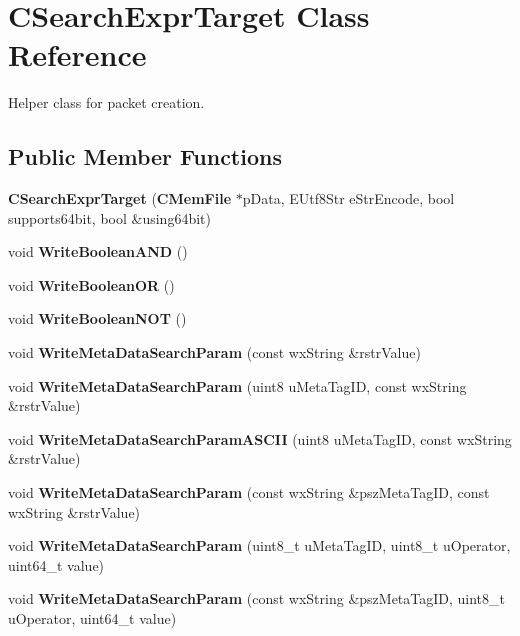 \section{CSearchExprTarget Class Reference}
\label{classCSearchExprTarget}


Helper class for packet creation.  
\subsection*{Public Member Functions}
\begin{DoxyCompactItemize}
\item 
{\bfseries CSearchExprTarget} ({\bf CMemFile} $\ast$pData, EUtf8Str eStrEncode, bool supports64bit, bool \&using64bit)\label{classCSearchExprTarget_a90de78d045d9b0cdf76a48194e67457e}

\item 
void {\bfseries WriteBooleanAND} ()\label{classCSearchExprTarget_ad206eebe66492bf994764d4881f989ab}

\item 
void {\bfseries WriteBooleanOR} ()\label{classCSearchExprTarget_acb80875a20b26f8c3fef7a5ad957ea6a}

\item 
void {\bfseries WriteBooleanNOT} ()\label{classCSearchExprTarget_a377e3f1a96f6a1e7f04df4bd7a3cded4}

\item 
void {\bfseries WriteMetaDataSearchParam} (const wxString \&rstrValue)\label{classCSearchExprTarget_a9a4546aa2a8234d55d2ef59c787b390e}

\item 
void {\bfseries WriteMetaDataSearchParam} (uint8 uMetaTagID, const wxString \&rstrValue)\label{classCSearchExprTarget_a9ead3d0e009e093746056cc3b33b1089}

\item 
void {\bfseries WriteMetaDataSearchParamASCII} (uint8 uMetaTagID, const wxString \&rstrValue)\label{classCSearchExprTarget_ade645be688325875446820a66a7a2849}

\item 
void {\bfseries WriteMetaDataSearchParam} (const wxString \&pszMetaTagID, const wxString \&rstrValue)\label{classCSearchExprTarget_af9a2593cb0ae1815247d8cd924014a85}

\item 
void {\bfseries WriteMetaDataSearchParam} (uint8\_\-t uMetaTagID, uint8\_\-t uOperator, uint64\_\-t value)\label{classCSearchExprTarget_ae0d1b4ab6d27f207cc2e0fca6a273528}

\item 
void {\bfseries WriteMetaDataSearchParam} (const wxString \&pszMetaTagID, uint8\_\-t uOperator, uint64\_\-t value)\label{classCSearchExprTarget_a649bee5bd95e53838a6401f4faec32a3}

\end{DoxyCompactItemize}
